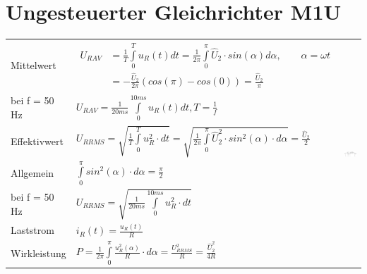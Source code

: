 \section{Ungesteuerter Gleichrichter M1U}


\begin{tabu}{|l|l|p{0.3\textwidth}}
  Mittelwert
  	& $ \begin{aligned}
  			U_{R AV} &= \frac{1}{T}\int\limits_{0}^{T}u_{R}(t)dt = \frac{1}{2\pi}\int\limits_{0}^{\pi}\hat{U}_{2} \cdot sin(\alpha)d\alpha, \qquad \alpha = \omega t\\
  					&= -\frac{\hat{U}_{2}}{2\pi}(cos(\pi)-cos(0))= \frac{\hat{U}_{2}}{\pi}
  		\end{aligned}$
  	& \\
  bei f = 50 Hz 
  	& $U_{R AV} = \frac{1}{20 ms}\int\limits_{0}^{10 ms}u_{R}(t)dt, T = \frac{1}{f}$ &\\
  Effektivwert 
  	& $U_{R RMS} = \sqrt{\frac{1}{T}\int\limits_{0}^{T}u_{R}^2 \cdot dt} = \sqrt{\frac{1}{2\pi}\int\limits_{0}^{\pi}\hat{U}_{2}^2 \cdot sin^2(\alpha) \cdot d\alpha} = \frac{\hat{U}_{2}}{2}$ &\\
  Allgemein 
  	& $\int\limits_{0}^{\pi}sin^2(\alpha) \cdot d\alpha = \frac{\pi}{2}$&\\
  bei f = 50 Hz 
  	& $U_{R RMS} = \sqrt{\frac{1}{20 ms}\int\limits_{0}^{10 ms}u_{R}^2 \cdot dt}$&\\
  Laststrom 
  	& $i_{R}(t) = \frac{u_{R}(t)}{R}$&\\
  Wirkleistung 
  	& $P = \frac{1}{2\pi}\int\limits_{0}^{\pi}\frac{u_{R}^2(\alpha)}{R} \cdot d\alpha = \frac{U_{R RMS}^2}{R} = \frac{\hat{U}_{2}^2}{4R}$&\\
\end{tabu}
